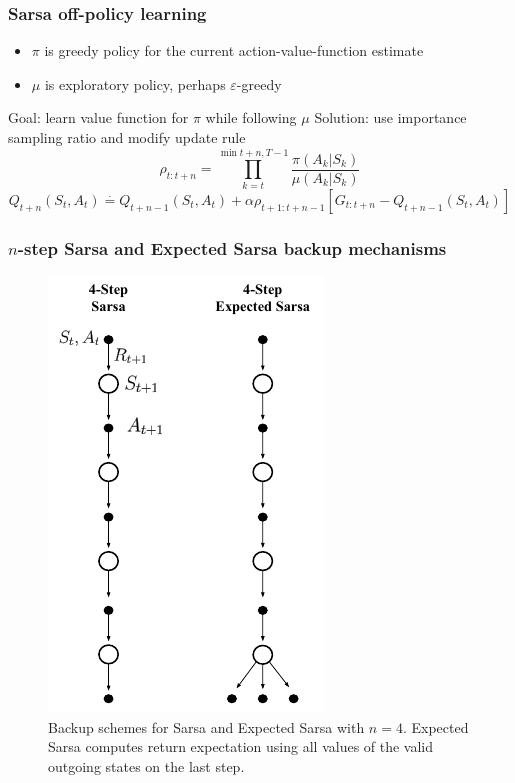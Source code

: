 \documentclass{beamer}
\begin{document}
\begin{frame}
  \frametitle{Sarsa off-policy learning}
  \begin{itemize}
    \item $\pi$ is greedy policy for the current action-value-function estimate
    \item $\mu$ is exploratory policy, perhaps $\varepsilon$-greedy
  \end{itemize}
  Goal: learn value function for $\pi$ while following $\mu$
  Solution: use importance sampling ratio and modify update rule
  $$\rho_{t : t + n} = \prod_{k = t}^{\min{t + n, T - 1}}
    \frac{\pi(A_k | S_k)}{\mu(A_k | S_k)}$$
  $$Q_{t + n}(S_t, A_t) \overset{\cdot}{=} Q_{t + n - 1}(S_t, A_t) +
    \alpha \rho_{t + 1 : t + n - 1} [G_{t : t + n} - Q_{t + n - 1}(S_t, A_t)]$$
\end{frame}

\begin{frame}
  \frametitle{$n$-step Sarsa and Expected Sarsa backup mechanisms}
  \begin{figure}
    \centering
    \includegraphics[height=0.6 \textheight]{sarsa_backup}
    \caption{Backup schemes for Sarsa and Expected Sarsa with $n = 4$. Expected
      Sarsa computes return expectation using all values of the valid outgoing
      states on the last step.}
  \end{figure}
\end{frame}
\end{document}
